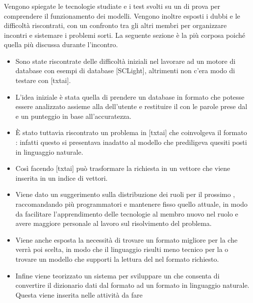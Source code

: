 \subsubsection{\Programmatore}
\par Vengono spiegate le tecnologie studiate e i test svolti su un  di prova per comprendere il funzionamento dei modelli. Vengono inoltre esposti i dubbi e le difficoltà riscontrati, con un confronto tra gli altri membri per organizzare incontri e sistemare i problemi sorti. La seguente sezione è la più corposa poiché quella più discussa durante l'incontro.
\begin{itemize}
	\item Sono state riscontrate delle difficoltà iniziali nel lavorare ad un motore di database con esempi di database [SCLight], altrimenti non c'era modo di testare con [txtai].
	\item L'idea iniziale è stata quella di prendere un database in formato  che potesse essere analizzato assieme alla  dell'utente e restituire il  con le parole prese dal  e un punteggio in base all'accuratezza.
	\item È stato tuttavia riscontrato un problema in [txtai] che coinvolgeva il formato : infatti questo si presentava inadatto al modello che prediligeva quesiti posti in linguaggio naturale.
	\item Così facendo [txtai] può trasformare la richiesta in un vettore che viene inserita in un indice di vettori.
	\item Viene dato un suggerimento sulla distribuzione dei ruoli per il prossimo , raccomandando più programmatori e mantenere fisso quello attuale, in modo da facilitare l'apprendimento delle tecnologie al membro nuovo nel ruolo e avere maggiore personale al lavoro sul risolvimento del problema.
	\item Viene anche esposta la necessità di trovare un formato migliore per la  che verrà poi scelta, in modo che il linguaggio risulti meno tecnico per la  o trovare un modello che supporti la lettura del  nel formato richiesto.
	\item Infine viene teorizzato un sistema per sviluppare un  che consenta di convertire il dizionario dati dal formato  ad un formato in linguaggio naturale. Questa viene inserita nelle attività da fare
\end{itemize}

